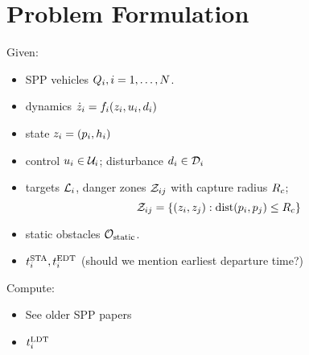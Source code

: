 \section{Problem Formulation \label{sec:formulation}}
Given:
\begin{itemize}
\item SPP vehicles $Q_{i}, i = 1, \ldots, N$.
\item dynamics $\dot{z}_i = f_i(z_i, u_i, d_i)$
\item state $z_i = (p_i, h_i)$
\item control $u_i \in \mathcal{U}_i$; disturbance $d_i \in \mathcal{D}_i$
\item targets $\mathcal{L}_i$, danger zones $\mathcal{Z}_{ij}$ with capture radius $R_c$; 
\begin{equation}
\mathcal{Z}_{ij} = \{(z_i, z_j): \text{dist}(p_i, p_j) \le R_c\}
\end{equation}

\item static obstacles $\mathcal{O}_\text{static}$.
\item $t^\text{STA}_i, t^\text{EDT}_i$ (should we mention earliest departure time?)
\end{itemize}

Compute:
\begin{itemize}
\item See older SPP papers
\item $t^\text{LDT}_i$
\end{itemize}
